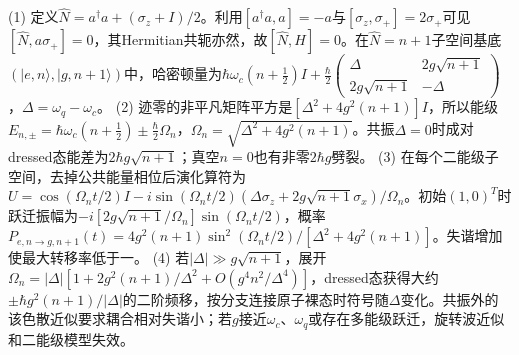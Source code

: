 (1) 定义\(\hat N=a^\dagger a+(\sigma_z+I)/2\)。利用\([a^\dagger a,a]=-a\)与\([\sigma_z,\sigma_+]=2\sigma_+\)可见\([\hat N,a\sigma_+]=0\)，其Hermitian共轭亦然，故\([\hat N,H]=0\)。在\(\hat N=n+1\)子空间基底\((|e,n\rangle,|g,n+1\rangle)\)中，哈密顿量为\(\hbar\omega_c(n+\tfrac12)I+\frac\hbar2\begin{pmatrix}\Delta&2g\sqrt{n+1}\\2g\sqrt{n+1}&-\Delta\end{pmatrix}\)，\(\Delta=\omega_q-\omega_c\)。
(2) 迹零的非平凡矩阵平方是\([\Delta^2+4g^2(n+1)]I\)，所以能级\(E_{n,\pm}=\hbar\omega_c(n+\tfrac12)\pm\frac\hbar2\Omega_n\)，\(\Omega_n=\sqrt{\Delta^2+4g^2(n+1)}\)。共振\(\Delta=0\)时成对dressed态能差为\(2\hbar g\sqrt{n+1}\)；真空\(n=0\)也有非零\(2\hbar g\)劈裂。
(3) 在每个二能级子空间，去掉公共能量相位后演化算符为\(U=\cos(\Omega_nt/2)I-i\sin(\Omega_nt/2)(\Delta\sigma_z+2g\sqrt{n+1}\sigma_x)/\Omega_n\)。初始\((1,0)^T\)时跃迁振幅为\(-i[2g\sqrt{n+1}/\Omega_n]\sin(\Omega_nt/2)\)，概率\(P_{e,n\to g,n+1}(t)=4g^2(n+1)\sin^2(\Omega_nt/2)/[\Delta^2+4g^2(n+1)]\)。失谐增加使最大转移率低于一。
(4) 若\(|\Delta|\gg g\sqrt{n+1}\)，展开\(\Omega_n=|\Delta|[1+2g^2(n+1)/\Delta^2+O(g^4n^2/\Delta^4)]\)，dressed态获得大约\(\pm\hbar g^2(n+1)/|\Delta|\)的二阶频移，按分支连接原子裸态时符号随\(\Delta\)变化。共振外的该色散近似要求耦合相对失谐小；若\(g\)接近\(\omega_c\)、\(\omega_q\)或存在多能级跃迁，旋转波近似和二能级模型失效。
